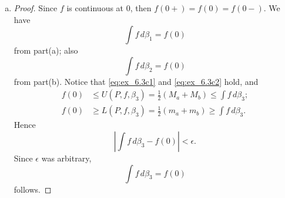 \begin{Exercise}
\begin{enumerate}[(a)]
		\item
		\begin{proof}
			Since $f$ is continuous at $0$, then $f(0+) = f(0) = f(0-)$.
			We have
			$$
			\int f\,d\beta_1 = f(0)
			$$
			from part(a); also
			$$
			\int f\,d\beta_2 = f(0)
			$$
			from part(b).
			Notice that \eqref{eq:ex_6.3c1} and \eqref{eq:ex_6.3c2} hold, and
			\begin{align*}
			f(0)
			&\leq U(P,f,\beta_3)
			= \frac{1}{2}(M_a + M_b)
			\leq \int f\,d\beta_3; \\
			f(0)
			&\geq L(P,f,\beta_3)
			= \frac{1}{2}(m_a + m_b)
			\geq \int f\,d\beta_3.			
			\end{align*}
			Hence
			$$
			\left| \int f\,d\beta_3 - f(0) \right| < \epsilon.
			$$
			Since $\epsilon$ was arbitrary,
			$$
			\int f\,d\beta_3 = f(0)
			$$
			follows.
		\end{proof}
	\end{enumerate}
\end{Exercise}